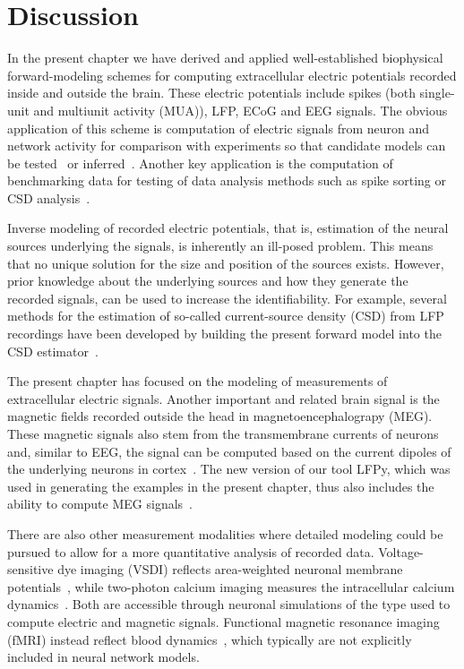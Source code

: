 \documentclass[preprint,11pt,authoryear]{elsarticle}
\begin{document}
\section{Discussion}
\label{sec:summary}

In the present chapter we have derived and applied well-established biophysical forward-modeling schemes for computing extracellular electric potentials recorded inside and outside the brain. These electric potentials include spikes (both single-unit and multiunit activity (MUA)), LFP, ECoG and EEG signals. The obvious application of this scheme is computation of electric signals from neuron and network activity for comparison with experiments so that candidate models can be tested~\citep{Einevoll2019} or inferred~\citep{Goncalves2019,Skaar2020}.
Another key application is the computation of benchmarking data for testing of data analysis methods such as 
spike sorting or CSD analysis~\citep{Denker2012}. 

Inverse modeling of recorded electric potentials, that is, estimation of the neural sources underlying the signals, is inherently an ill-posed problem. This means that no unique solution for the size and position of the sources exists. However, prior knowledge about the underlying sources and how they generate the recorded signals, can be used to increase the identifiability. For example, several methods for the estimation of so-called current-source density (CSD) from LFP recordings have been developed by building the present forward model into the CSD 
estimator~\citep{Pettersen2006,Potworowski2012,Cserpan2017}.

The present chapter has focused on the modeling of measurements of extracellular electric signals. Another important and related brain signal
is the magnetic fields recorded outside the head in magnetoencephalograpy (MEG). These magnetic signals also stem from the transmembrane currents of neurons and, similar to EEG, the signal can be computed based on the current dipoles of the underlying neurons in 
cortex~\citep{Hamalainen1993,Ilmoniemi2019}. The new version of our tool LFPy, which was used in generating the examples in the present chapter, thus also includes the ability to compute MEG signals~\citep{Hagen2018}. 

There are also other measurement modalities where detailed modeling could be pursued to allow for a more quantitative analysis of recorded data. Voltage-sensitive dye imaging (VSDI) reflects area-weighted neuronal membrane potentials~\citep{Chemla2012}, while two-photon calcium imaging measures the intracellular calcium dynamics~\citep{Helmchen2012}. Both are accessible through neuronal simulations of the type used to compute electric and magnetic signals. Functional magnetic resonance imaging (fMRI) instead reflect blood dynamics~\citep{Bartels2012}, 
which typically are not explicitly included in neural network models.
\end{document}
